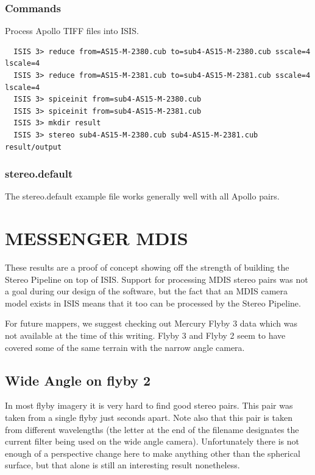 \subsubsection*{Commands}

Process Apollo TIFF files into \ac{ISIS}.
\begin{verbatim}
  ISIS 3> reduce from=AS15-M-2380.cub to=sub4-AS15-M-2380.cub sscale=4 lscale=4
  ISIS 3> reduce from=AS15-M-2381.cub to=sub4-AS15-M-2381.cub sscale=4 lscale=4
  ISIS 3> spiceinit from=sub4-AS15-M-2380.cub
  ISIS 3> spiceinit from=sub4-AS15-M-2381.cub
  ISIS 3> mkdir result
  ISIS 3> stereo sub4-AS15-M-2380.cub sub4-AS15-M-2381.cub result/output
\end{verbatim}

\subsubsection*{stereo.default}

The stereo.default example file works generally well with all Apollo pairs.

\pagebreak

\section{MESSENGER MDIS}

These results are a proof of concept showing off the strength of
building the Stereo Pipeline on top of \ac{ISIS}. Support for processing
MDIS stereo pairs was not a goal during our design of the software,
but the fact that an MDIS camera model exists in ISIS means that
it too can be processed by the Stereo Pipeline.

For future mappers, we suggest checking out Mercury Flyby 3 data which
was not available at the time of this writing. Flyby 3 and Flyby 2
seem to have covered some of the same terrain with the narrow angle
camera.

\subsection{Wide Angle on flyby 2}

In most flyby imagery it is very hard to find good stereo pairs.
This pair was taken from a single flyby just seconds apart. Note
also that this pair is taken from different wavelengths (the letter
at the end of the filename designates the current filter being used
on the wide angle camera). Unfortunately there is not enough of a
perspective change here to make anything other than the spherical
surface, but that alone is still an interesting result nonetheless.

